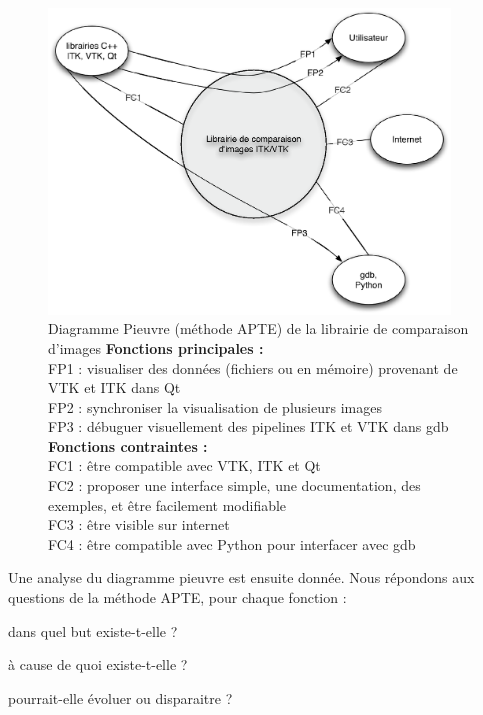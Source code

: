 \begin{figure}[h]
  \begin{center}
  \leavevmode
  \includegraphics[width=0.95\textwidth]{pictures/ComparePIEUVRE}
  \end{center}
  \caption[Diagramme Pieuvre (méthode {APTE\textregistered}) de
    la librairie de comparaison d'images]{Diagramme
    Pieuvre (méthode {APTE\textregistered})
    de la librairie de comparaison d'images
  \small
  \textbf{Fonctions principales :}\\
  FP1 : visualiser des données (fichiers ou en mémoire) provenant 
    de VTK et ITK dans Qt\\
  FP2 : synchroniser la visualisation de plusieurs images\\
  FP3 : débuguer visuellement des pipelines ITK et VTK dans gdb\\
    \textbf{Fonctions contraintes :} \\
  FC1 : être compatible avec VTK, ITK et Qt\\
  FC2 : proposer une interface simple, une documentation, des exemples, et être
    facilement modifiable\\
  FC3 : être visible sur internet\\
  FC4 : être compatible avec Python pour interfacer avec gdb}
  \label{fig:PIEUVRECompare}
\end{figure}


\clearpage


Une analyse du diagramme pieuvre est ensuite donnée. Nous répondons aux questions de la méthode {APTE\textregistered}, pour chaque fonction :
\begin{inparaenum}[(i)] 
  \item dans quel but existe-t-elle ?
  \item à cause de quoi existe-t-elle ?
  \item pourrait-elle évoluer ou disparaitre ?
\end{inparaenum}


